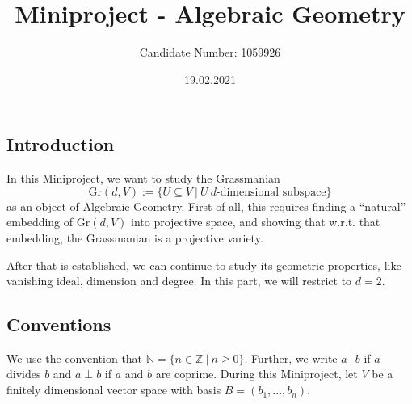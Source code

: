 \documentclass{scrartcl}
\title{Miniproject - Algebraic Geometry}
\author{Candidate Number: 1059926}
\date{19.02.2021}
\newcommand{\N}{\mathbb{N}}
\newcommand{\Z}{\mathbb{Z}}
\newcommand{\Gr}{\mathrm{Gr}}
\newcommand{\divides}{\ | \ }
\theoremstyle{definition}
\begin{document}
\maketitle

\subsection*{Introduction}

In this Miniproject, we want to study the Grassmanian
\begin{equation*}
    \Gr(d, V) := \{ U \subseteq V \ | \ U \ \text{$d$-dimensional subspace} \}
\end{equation*}
as an object of Algebraic Geometry.
First of all, this requires finding a ``natural'' embedding of $\Gr(d, V)$ into projective space, and showing that w.r.t. that embedding, the Grassmanian is a projective variety.

After that is established, we can continue to study its geometric properties, like vanishing ideal, dimension and degree.
In this part, we will restrict to $d = 2$.

\subsection*{Conventions}
We use the convention that $\N = \{ n \in \Z \ | \ n \geq 0 \}$.
Further, we write $a \divides b$ if $a$ divides $b$ and $a \perp b$ if $a$ and $b$ are coprime.
During this Miniproject, let $V$ be a finitely dimensional vector space with basis $B = (b_1, ..., b_n)$.
\end{document}
